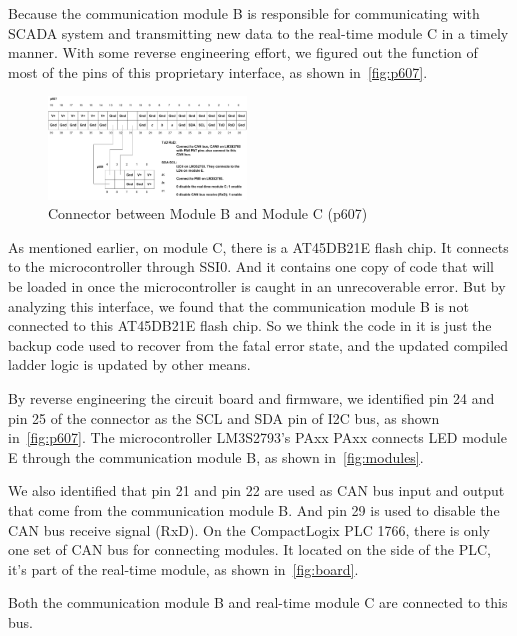 Because the communication module B is responsible for communicating with SCADA system and transmitting new data to the real-time module C in a timely manner. With some reverse engineering effort, we figured out the function of most of the pins of this proprietary interface, as shown in~\autoref{fig:p607}.

\begin{figure}[th]
	\includegraphics[width=0.47\textwidth]{figures/p607}
	\centering
	\caption{Connector between Module B and Module C (p607)}
	\label{fig:p607}
\end{figure}

As mentioned earlier, on module C, there is a AT45DB21E flash chip. It connects to the microcontroller through SSI0. And it contains one copy of code that will be loaded in once the microcontroller is caught in an unrecoverable error. But by analyzing this interface, we found that the communication module B is not connected to this AT45DB21E flash chip. So we think the code in it is just the backup code used to recover from the fatal error state, and the updated compiled ladder logic is updated by other means.  

By reverse engineering the circuit board and firmware, we identified pin 24 and pin 25 of the connector as the SCL and SDA pin of I2C bus, as shown in~\autoref{fig:p607}. The microcontroller LM3S2793's PAxx PAxx connects LED module E through the communication module B, as shown in~\autoref{fig:modules}.

We also identified that pin 21 and pin 22 are used as CAN bus input and output that come from the communication module B. And pin 29 is used to disable the CAN bus receive signal (RxD). On the CompactLogix PLC 1766, there is only one set of CAN bus for connecting modules. It located on the side of the PLC, it's part of the real-time module, as shown in~\autoref{fig:board}.


Both the communication module B and real-time module C are connected to this bus.
